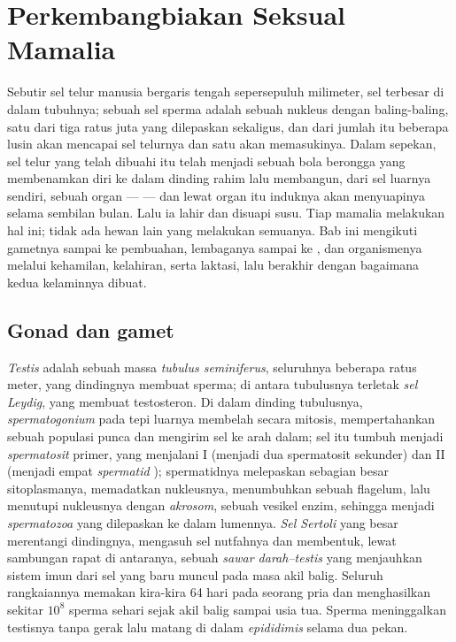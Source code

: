 \chapter{Perkembangbiakan Seksual Mamalia}\label{ch:b2:mammal-reproduction}

Sebutir sel telur manusia bergaris tengah sepersepuluh milimeter, sel
terbesar di dalam tubuhnya; sebuah sel sperma adalah sebuah nukleus
dengan baling-baling, satu dari tiga ratus juta yang dilepaskan
sekaligus, dan dari jumlah itu beberapa lusin akan mencapai sel
telurnya dan satu akan memasukinya. Dalam sepekan, sel telur yang telah
dibuahi itu telah menjadi sebuah bola berongga yang membenamkan diri ke
dalam dinding rahim lalu membangun, dari sel luarnya sendiri, sebuah
organ ---  --- dan lewat organ itu induknya akan
menyuapinya selama sembilan bulan. Lalu ia lahir dan disuapi susu. Tiap
mamalia melakukan hal ini; tidak ada hewan lain yang melakukan
semuanya. Bab ini mengikuti gametnya sampai ke pembuahan, lembaganya
sampai ke , dan organismenya melalui kehamilan, kelahiran,
serta laktasi, lalu berakhir dengan bagaimana kedua kelaminnya dibuat.

\section{Gonad dan gamet}

\begin{definition}\label{def:b2:mammal-reproduction:testis}
\emph{Testis} adalah sebuah massa \emph{tubulus seminiferus},
seluruhnya beberapa ratus meter, yang dindingnya membuat sperma; di
antara tubulusnya terletak \emph{sel Leydig}, yang membuat testosteron.
Di dalam dinding tubulusnya, \emph{spermatogonium} pada tepi luarnya
membelah secara mitosis, mempertahankan sebuah populasi punca dan
mengirim sel ke arah dalam; sel itu tumbuh menjadi \emph{spermatosit}
primer, yang menjalani  I (menjadi dua spermatosit sekunder) dan
 II (menjadi empat \emph{spermatid} );
spermatidnya melepaskan sebagian besar sitoplasmanya, memadatkan
nukleusnya, menumbuhkan sebuah flagelum, lalu menutupi nukleusnya
dengan \emph{akrosom}, sebuah vesikel enzim, sehingga menjadi
\emph{spermatozoa} yang dilepaskan ke dalam lumennya. \emph{Sel
Sertoli} yang besar merentangi dindingnya, mengasuh sel nutfahnya dan
membentuk, lewat sambungan rapat di antaranya, sebuah
\emph{sawar darah--testis} yang menjauhkan sistem imun dari sel yang
baru muncul pada masa akil balig. Seluruh rangkaiannya memakan
kira-kira \num{64} hari pada seorang pria dan menghasilkan sekitar
$10^{8}$ sperma sehari sejak akil balig sampai usia tua. Sperma
meninggalkan testisnya tanpa gerak lalu matang di dalam
\emph{epididimis} selama dua pekan.
\end{definition}

